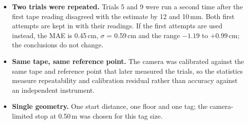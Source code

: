 \begin{warnbox}
\small
\begin{itemize}
  \item \textbf{Two trials were repeated.} Trials 5 and 9 were run a second time after the first tape reading disagreed
        with the estimate by 12 and 10\,mm. Both first attempts are kept in  with their readings.
        If the first attempts are used instead, the MAE is 0.45\,cm, $\sigma$ = 0.59\,cm and the range $-1.19$ to
        $+0.99$\,cm; the conclusions do not change.
  \item \textbf{Same tape, same reference point.} The camera was calibrated against the same tape and reference point
        that later measured the trials, so the statistics measure repeatability and calibration residual rather than
        accuracy against an independent instrument.
  \item \textbf{Single geometry.} One start distance, one floor and one tag; the camera-limited stop at 0.50\,m was chosen
        for this tag size.
\end{itemize}
\end{warnbox}
